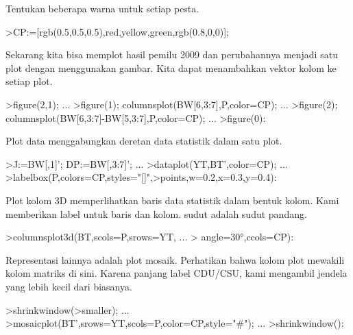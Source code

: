 \documentclass[a4paper,10pt]{article}
\begin{document}
\begin{eulernotebook}
\begin{eulercomment}
\begin{eulercomment}
\begin{eulercomment}
Tentukan beberapa warna untuk setiap pesta.
\end{eulercomment}
\begin{eulerprompt}
>CP:=[rgb(0.5,0.5,0.5),red,yellow,green,rgb(0.8,0,0)];
\end{eulerprompt}
\begin{eulercomment}
Sekarang kita bisa memplot hasil pemilu 2009 dan perubahannya menjadi
satu plot dengan menggunakan gambar. Kita dapat menambahkan vektor
kolom ke setiap plot.
\end{eulercomment}
\begin{eulerprompt}
>figure(2,1);  ...
>figure(1); columnsplot(BW[6,3:7],P,color=CP); ...
>figure(2); columnsplot(BW[6,3:7]-BW[5,3:7],P,color=CP);  ...
>figure(0):
\end{eulerprompt}
\begin{eulercomment}
Plot data menggabungkan deretan data statistik dalam satu plot.
\end{eulercomment}
\begin{eulerprompt}
>J:=BW[,1]'; DP:=BW[,3:7]'; ...
>dataplot(YT,BT',color=CP);  ...
>labelbox(P,colors=CP,styles="[]",>points,w=0.2,x=0.3,y=0.4):
\end{eulerprompt}
\begin{eulercomment}
Plot kolom 3D memperlihatkan baris data statistik dalam bentuk kolom.
Kami memberikan label untuk baris dan kolom. sudut adalah sudut
pandang.
\end{eulercomment}
\begin{eulerprompt}
>columnsplot3d(BT,scols=P,srows=YT, ...
>  angle=30°,ccols=CP):
\end{eulerprompt}
\begin{eulercomment}
Representasi lainnya adalah plot mosaik. Perhatikan bahwa kolom plot
mewakili kolom matriks di sini. Karena panjang label CDU/CSU, kami
mengambil jendela yang lebih kecil dari biasanya.
\end{eulercomment}
\begin{eulerprompt}
>shrinkwindow(>smaller);  ...
>mosaicplot(BT',srows=YT,scols=P,color=CP,style="#"); ...
>shrinkwindow():
\end{eulerprompt}
\begin{eulercomment}

\end{eulercomment}
\end{eulercomment}
\end{eulercomment}
\end{eulernotebook}
\end{document}
